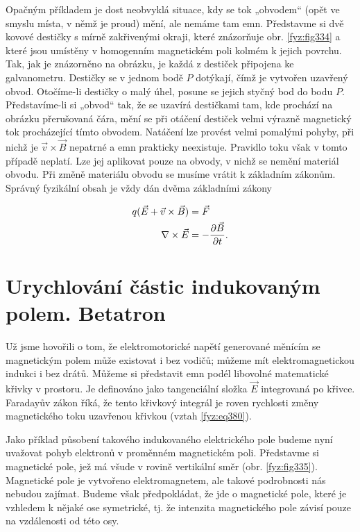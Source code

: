 {  Opačným příkladem je dost neobvyklá situace, kdy se tok „obvodem“ (opět ve smyslu místa, v němž 
  je proud) mění, ale nemáme tam emn. Představme si dvě kovové destičky s mírně zakřivenými okraji, 
  které znázorňuje obr. \ref{fyz:fig334} a které jsou umístěny v homogenním magnetickém poli kolmém 
  k jejich povrchu. Tak, jak je znázorněno na obrázku, je každá z destiček připojena ke 
  galvanometru. Destičky se v jednom bodě \(P\) dotýkají, čímž je vytvořen uzavřený obvod. 
  Otočíme-li destičky o malý úhel, posune se jejich styčný bod do bodu \(P\). Představíme-li 
  si „obvod“ tak, že se uzavírá destičkami tam, kde prochází na obrázku přerušovaná čára, mění se 
  při otáčení destiček velmi výrazně magnetický tok procházející tímto obvodem. Natáčení lze 
  provést velmi pomalými pohyby, při nichž je \(\vec{v}\times\vec{B}\) nepatrné a emn prakticky 
  neexistuje. Pravidlo toku však v tomto případě neplatí. Lze jej aplikovat pouze na obvody, v 
  nichž se nemění materiál obvodu. Při změně materiálu obvodu se musíme vrátit k základním zákonům. 
  Správný fyzikální obsah je vždy dán dvěma základními zákony
  
  \begin{align*}
    q(\vec{E} + \vec{v}\times\vec{B}) &=  \vec{F}   \\
                  \nabla\times\vec{E} &= -\dfrac{\partial \vec{B}}{\partial t}.
  \end{align*}

\section{Urychlování částic indukovaným polem. Betatron}\label{fyz:IIchapXVIIsecIII}
  Už jsme hovořili o tom, že elektromotorické napětí generované měnícím se magnetickým polem může 
  existovat i bez vodičů; můžeme mít elektromagnetickou indukci i bez drátů. Můžeme si představit 
  emn podél libovolné matematické křivky v prostoru. Je definováno jako tangenciální složka 
  \(\vec{E}\) integrovaná po křivce. Faradayův zákon říká, že tento křivkový integrál je roven 
  rychlosti změny magnetického toku uzavřenou křivkou (vztah \ref{fyz:eq380}).
  
  Jako příklad působení takového indukovaného elektrického pole budeme nyní uvažovat pohyb 
  elektronů v proměnném magnetickém poli. Představme si magnetické pole, jež má všude v rovině 
  vertikální směr (obr. \ref{fyz:fig335}). Magnetické pole je vytvořeno elektromagnetem, ale takové 
  podrobnosti nás nebudou zajímat. Budeme však předpokládat, že jde o magnetické pole, které je 
  vzhledem k nějaké ose symetrické, tj. že intenzita magnetického pole závisí pouze na vzdálenosti 
  od této osy.

}
